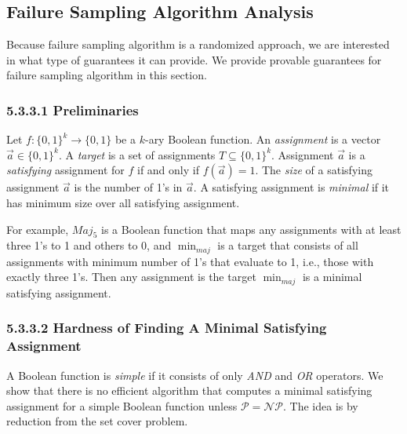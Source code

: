 

\newtheorem{proof}{Proof}

\subsection{Failure Sampling Algorithm Analysis}
\label{alg-notes}

Because failure sampling algorithm is a randomized approach,
we are interested in what type of guarantees it can provide.
We provide provable guarantees for failure sampling algorithm
in this section.

\subsubsection{5.3.3.1 \enskip Preliminaries}

Let $f:\{0,1\}^k \rightarrow \{0, 1\}$ be a $k$-ary Boolean function. An
\emph{assignment} is a vector $\vec{a} \in \{0,1\}^k$. A \emph{target}
is a set of assignments $T \subseteq \{0, 1\}^k$. Assignment $\vec{a}$
is a \emph{satisfying} assignment for $f$ if and only if $f(\vec{a}) =
1$. The \emph{size} of a satisfying assignment $\vec{a}$ is the number
of 1's in $\vec{a}$. A satisfying assignment is \emph{minimal} if it has
minimum size over all satisfying assignment.

For example, $Maj_5$ is a Boolean function that maps any assignments
with at least three 1's to 1 and others to 0, and $\min_{maj}$ is a
target that consists of all assignments with minimum number of 1's that
evaluate to 1, i.e., those with exactly three 1's. Then any assignment
is the target $\min_{maj}$ is a minimal satisfying assignment.

\subsubsection{5.3.3.2 \enskip Hardness of Finding A Minimal Satisfying Assignment}

A Boolean function is \emph{simple} if it consists of only \emph{AND}
and \emph{OR} operators. We show that there is no efficient algorithm
that computes a minimal satisfying assignment for a simple Boolean
function unless $\mathcal{P} = \mathcal{NP}$. The idea is by reduction
from the set cover problem.

